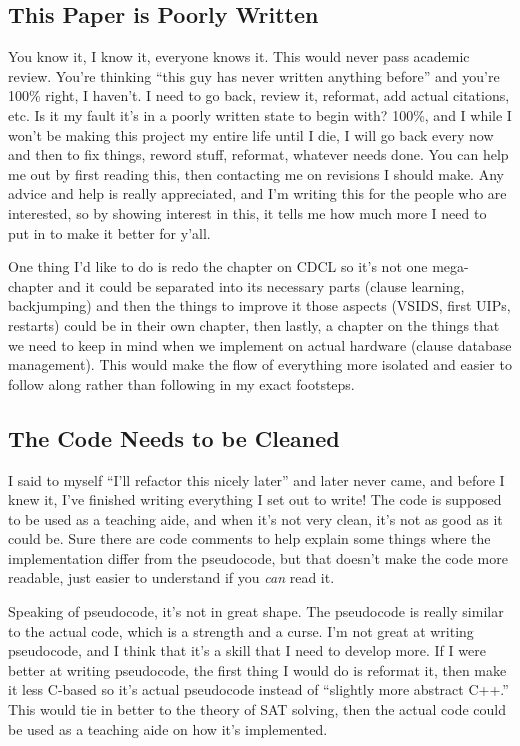 \documentclass[oneside]{book}
\begin{document}
\subsection{This Paper is Poorly Written}

You know it, I know it, everyone knows it. This would never pass academic review. 
You're thinking ``this guy has never written anything before'' and you're 100\% 
right, I haven't. I need to go back, review it, reformat, add actual citations, etc.
Is it my fault it's in a poorly written state to begin with? 100\%, and I while I won't 
be making this project my entire life until I die, I will go back every now and then to 
fix things, reword stuff, reformat, whatever needs done. You can help me out by first 
reading this, then contacting me on revisions I should make. Any advice and help is 
really appreciated, and I'm writing this for the people who are interested, so 
by showing interest in this, it tells me how much more I need to put in to make it 
better for y'all.

One thing I'd like to do is redo the chapter on CDCL so it's not one mega-chapter
and it could be separated into its necessary parts (clause learning, backjumping)
and then the things to improve it those aspects (VSIDS, first UIPs, restarts)
could be in their own chapter, then lastly, a chapter on the things that we 
need to keep in mind when we implement on actual hardware (clause database management).
This would make the flow of everything more isolated and easier to follow along 
rather than following in my exact footsteps. 

\subsection{The Code Needs to be Cleaned}

I said to myself ``I'll refactor this nicely later'' and later never came, and before
I knew it, I've finished writing everything I set out to write! The code is supposed to 
be used as a teaching aide, and when it's not very clean, it's not as good as it could be. 
Sure there are code comments to help explain some things where the implementation differ 
from the pseudocode, but that doesn't make the code more readable, just easier to understand 
if you \textit{can} read it.

Speaking of pseudocode, it's not in great shape. The pseudocode is really similar to the 
actual code, which is a strength and a curse. I'm not great at writing pseudocode, and I 
think that it's a skill that I need to develop more. If I were better at writing pseudocode,
the first thing I would do is reformat it, then make it less C-based so it's actual 
pseudocode instead of ``slightly more abstract C++.'' This would tie in better to the 
theory of SAT solving, then the actual code could be used as a teaching aide on how it's 
implemented.
\end{document}
